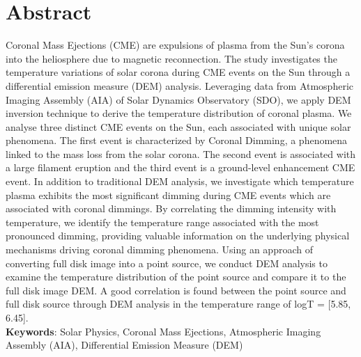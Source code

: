 
\setcounter{page}{1}
\section{Abstract}



Coronal Mass Ejections (CME) are expulsions of plasma from the Sun's corona into the heliosphere due to magnetic reconnection. The study investigates the temperature variations of solar corona during CME events on the Sun through a differential emission measure (DEM) analysis. Leveraging data from Atmospheric Imaging Assembly (AIA) of Solar Dynamics Observatory (SDO), we apply DEM inversion technique to derive the temperature distribution of coronal plasma. We analyse three distinct CME events on the Sun, each associated with unique solar phenomena. The first event is characterized by Coronal Dimming, a phenomena linked to the mass loss from the solar corona. The second event is associated with a large filament eruption and the third event is a ground-level enhancement CME event. In addition to traditional DEM analysis, we investigate which temperature plasma exhibits the most significant dimming during CME events which are associated with coronal dimmings. By correlating the dimming intensity with temperature, we identify the temperature range associated with the most pronounced dimming, providing valuable information on the underlying physical mechanisms driving coronal dimming phenomena. Using an approach of converting full disk image into a point source, we conduct DEM analysis to examine the temperature distribution of the point source and compare it to the full disk image DEM. A good correlation is found between the point source and full disk source through DEM analysis in the temperature range of logT = [5.85, 6.45].\\


\noindent
\textbf{Keywords}: Solar Physics, Coronal Mass Ejections, Atmospheric Imaging Assembly (AIA), Differential Emission Measure (DEM)

